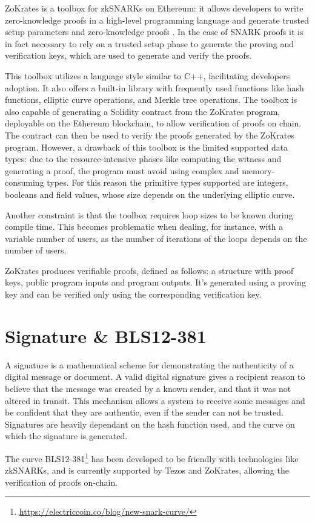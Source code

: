 ZoKrates is a toolbox for zkSNARKs on Ethereum: it allows developers to write zero-knowledge proofs in a high-level programming language and generate trusted setup parameters and zero-knowledge proofs \cite{eberhardt_ZoKrates_2018}. In the case of SNARK proofs it is in fact necessary to rely on a trusted setup phase to generate the proving and verification keys, which are used to generate and verify the proofs.

This toolbox utilizes a language style similar to C++, facilitating developers adoption. It also offers a built-in library with frequently used functions like hash functions, elliptic curve operations, and Merkle tree operations. The toolbox is also capable of generating a Solidity contract from the ZoKrates program, deployable on the Ethereum blockchain, to allow verification of proofs on chain. The contract can then be used to verify the proofs generated by the ZoKrates program. However, a drawback of this toolbox is the limited supported data types: due to the resource-intensive phases like computing the witness and generating a proof, the program must avoid using complex and memory-consuming types. For this reason the primitive types supported are integers, booleans and field values, whose size depends on the underlying elliptic curve.

Another constraint is that the toolbox requires loop sizes to be known during compile time. This becomes problematic when dealing, for instance, with a variable number of users, as the number of iterations of the loops depends on the number of users.

ZoKrates produces verifiable proofs, defined as follows: a structure with proof keys, public program inputs and program outputs. It's generated using a proving key and can be verified only using the corresponding verification key.

\section{Signature \& BLS12-381}

A signature is a mathematical scheme for demonstrating the authenticity of a digital message or document. A valid digital signature gives a recipient reason to believe that the message was created by a known sender, and that it was not altered in transit. This mechanism allows a system to receive some messages and be confident that they are authentic, even if the sender can not be trusted. Signatures are heavily dependant on the hash function used, and the curve on which the signature is generated.

The curve BLS12-381\footnote{\url{https://electriccoin.co/blog/new-snark-curve/}} has been developed to be friendly with technologies like zkSNARKs, and is currently supported by Tezos and ZoKrates, allowing the verification of proofs on-chain.